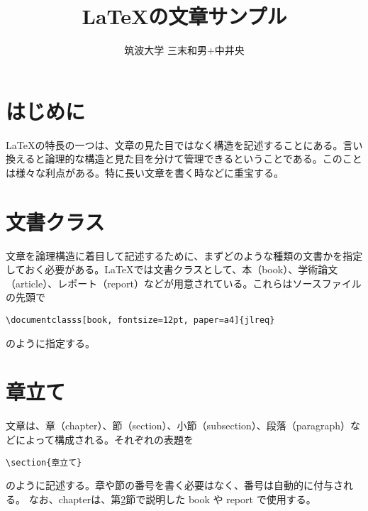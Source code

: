 \documentclass[fontsize=12pt, paper=a4]{jlreq}
\title{\LaTeX の文章サンプル}
\author{筑波大学 三末和男+中井央}
\begin{document}
\maketitle

\section{はじめに}

\LaTeX の特長の一つは、文章の見た目ではなく構造を記述することにある。言い換えると論理的な構造と見た目を分けて管理できるということである。このことは様々な利点がある。特に長い文章を書く時などに重宝する。

\section{文書クラス}\label{sec:documentclass}

文章を論理構造に着目して記述するために、まずどのような種類の文書かを指定しておく必要がある。\LaTeX では文書クラスとして、本（book）、学術論文（article）、レポート（report）などが用意されている。これらはソースファイルの先頭で
\begin{verbatim}
\documentclasss[book, fontsize=12pt, paper=a4]{jlreq}
\end{verbatim}
のように指定する。


\section{章立て}\label{sec:structure}

文章は、章（chapter）、節（section）、小節（subsection）、段落（paragraph）などによって構成される。それぞれの表題を
\begin{verbatim}
\section{章立て}
\end{verbatim}
のように記述する。章や節の番号を書く必要はなく、番号は自動的に付与される。
なお、chapterは、第\ref{sec:documentclass}節で説明した book や report で使用する。
\end{document}
